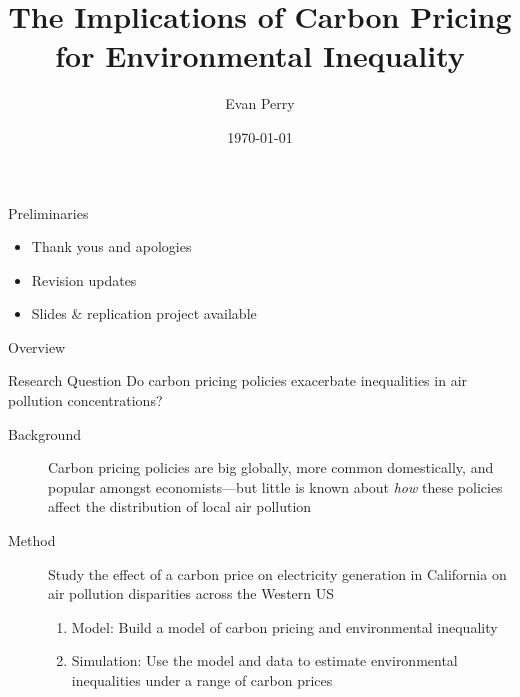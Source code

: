 \documentclass[11pt, aspectratio = 169]{beamer}
\title[Carbon Pricing \& Environmental Inequality]{The Implications of Carbon Pricing\\ for Environmental Inequality}
\author{Evan Perry}
\date{\today}
\newcommand{\1}{\mathds{1}}
\begin{document}
\maketitlepage

\begin{frame}{Preliminaries}
    
\begin{itemize}
    \item Thank yous and apologies
    \vfill
    \item Revision updates
    \vfill
    \item Slides \& replication project available
\end{itemize}


\end{frame}


\begin{frame}{Overview}

\begin{block}{Research Question}
    Do carbon pricing policies exacerbate inequalities in air pollution concentrations?
\end{block}
\vfill

\begin{description}
    \item[Background] Carbon pricing policies are big globally, more common domestically, and popular amongst economists---but little is known about \emph{how} these policies affect the distribution of local air pollution
    \vfill
    \item[Method]  Study the effect of a carbon price on electricity generation in California on air pollution disparities across the Western US
    \begin{enumerate}
        \item Model: Build a model of carbon pricing and environmental inequality
        \item Simulation: Use the model and data to estimate environmental inequalities under a range of carbon prices
    \end{enumerate}
\end{description}
    
\end{frame}
\end{document}
